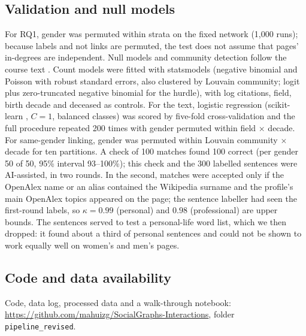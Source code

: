 \documentclass[9pt,twocolumn,twoside,lineno]{pnas-new}
\begin{document}
\subsection*{Validation and null models}
For RQ1, gender was permuted within strata on the fixed network (1,000 runs); because labels and not links are permuted, the test does not assume that pages' in-degrees are independent. Null models and community detection follow the course text \cite{coscia2025atlas}. Count models were fitted with statsmodels \cite{seabold2010statsmodels} (negative binomial and Poisson with robust standard errors, also clustered by Louvain community; logit plus zero-truncated negative binomial for the hurdle), with log citations, field, birth decade and deceased as controls. For the text, logistic regression (scikit-learn \cite{pedregosa2011scikit}, $C=1$, balanced classes) was scored by five-fold cross-validation and the full procedure repeated 200 times with gender permuted within field $\times$ decade. For same-gender linking, gender was permuted within Louvain community $\times$ decade for ten partitions. A check of 100 matches found 100 correct (per gender 50 of 50, 95\% interval 93--100\%); this check and the 300 labelled sentences were AI-assisted, in two rounds. In the second, matches were accepted only if the OpenAlex name or an alias contained the Wikipedia surname and the profile's main OpenAlex topics appeared on the page; the sentence labeller had seen the first-round labels, so $\kappa=0.99$ (personal) and $0.98$ (professional) are upper bounds. The sentences served to test a personal-life word list, which we then dropped: it found about a third of personal sentences and could not be shown to work equally well on women's and men's pages.

\subsection*{Code and data availability}
Code, data log, processed data and a walk-through notebook: \url{https://github.com/mahuizg/SocialGraphs-Interactions}, folder \texttt{pipeline\_revised}.


\end{document}
